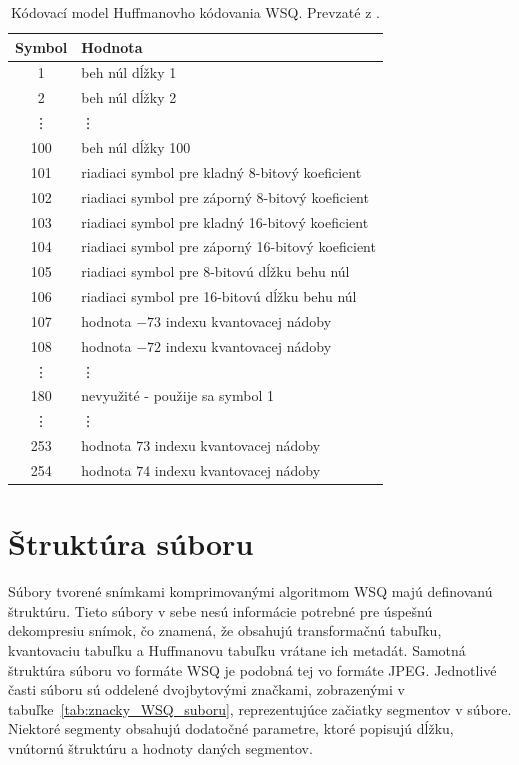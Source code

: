   \begin{table}[ht]
    \centering
    \caption{Kódovací model Huffmanovho kódovania WSQ. Prevzaté z \cite{WSQSpecification}.}
    \begin{tabular}{| c  l |}
      \hline
      \textbf{Symbol} & \textbf{Hodnota} \\
      \hline
      1 & beh núl dĺžky 1 \\
      2 & beh núl dĺžky 2 \\
      \vdots & \vdots \\
      100 & beh núl dĺžky 100 \\
      101 & riadiaci symbol pre kladný 8-bitový koeficient  \\
      102 & riadiaci symbol pre záporný 8-bitový koeficient \\
      103 & riadiaci symbol pre kladný 16-bitový koeficient \\
      104 & riadiaci symbol pre záporný 16-bitový koeficient \\
      105 & riadiaci symbol pre 8-bitovú dĺžku behu núl \\
      106 & riadiaci symbol pre 16-bitovú dĺžku behu núl \\
      107 & hodnota $-73$ indexu kvantovacej nádoby \\
      108 & hodnota $-72$ indexu kvantovacej nádoby \\
      \vdots & \vdots \\
      180 & nevyužité - použije sa symbol 1 \\
      \vdots & \vdots \\
      253 & hodnota $73$ indexu kvantovacej nádoby \\
      254 & hodnota $74$ indexu kvantovacej nádoby \\
      \hline
    \end{tabular}
    \label{tab:kodovaci_model}
  \end{table}

  \section{Štruktúra súboru} \label{sec:struktura}
  Súbory tvorené snímkami komprimovanými algoritmom WSQ majú definovanú štruktúru. Tieto súbory v sebe nesú informácie potrebné pre úspešnú
  dekompresiu snímok, čo znamená, že obsahujú transformačnú tabuľku, kvantovaciu tabuľku a Huffmanovu tabuľku vrátane ich metadát.
  Samotná štruktúra súboru vo formáte WSQ je podobná tej vo formáte JPEG. Jednotlivé časti súboru sú oddelené dvojbytovými značkami,
  zobrazenými v tabuľke~{\ref{tab:znacky_WSQ_suboru}}, reprezentujúce začiatky segmentov v súbore. Niektoré segmenty obsahujú dodatočné parametre,
  ktoré popisujú dĺžku, vnútornú štruktúru a hodnoty daných segmentov.

